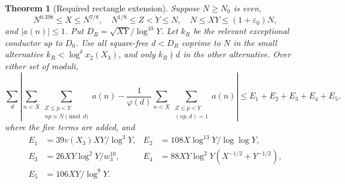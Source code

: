 \documentclass[11pt]{article}
\newtheorem{theorem}{Theorem}[section]
\theoremstyle{definition}
\newcommand{\eps}{\varepsilon}
\begin{document}
\begin{theorem}[Required rectangle extension]\label{thm:rectangle}
Suppose $N\ge N_0$ is even,
\[
 N^{0.398}\le X\le N^{7/8},\quad N^{1/8}\le Z<Y\le N,
 \quad N\le XY\le(1+\eps_0)N,
\]
and $|a(n)|\le1$.  Put $D_R=\sqrt{XY}/\log^{10}Y$.
Let $k_R$ be the relevant exceptional conductor up to $D_0$.
Use all square-free $d<D_R$ coprime to $N$ in the small alternative
$k_R<\log^\delta x_2(X_3)$, and only $k_R\nmid d$ in the other
alternative.  Over either set of moduli,
\begin{equation}\label{eq:rectangle-discrepancy}
 \sum_d\left|\sum_{n<X}\sum_{\substack{Z\le p<Y\\np\equiv N\pmod d}}a(n)
 -\frac1{\varphi(d)}\sum_{n<X}\sum_{\substack{Z\le p<Y\\(np,d)=1}}a(n)\right|
 \le E_1+E_2+E_3+E_4+E_5,
\end{equation}
where the five terms are added, and
\begin{align*}
 E_1&=39v(X_3)XY/\log^3Y,&
 E_2&=108X\log^{13}Y/\log\log Y,\\
 E_3&=26XY\log^2Y/w_3^{10},&
 E_4&=88XY\log^2Y(X^{-1/2}+Y^{-1/2}),\\
 E_5&=106XY/\log^9Y.
\end{align*}
\end{theorem}
\end{document}
